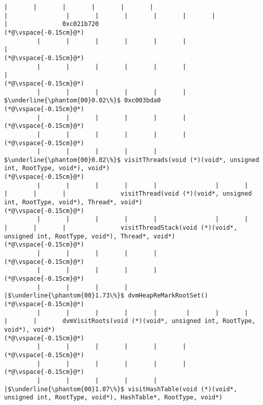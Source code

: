 \begin{lstlisting}[caption=NewDirectByteBuffer, label=profile:C2JNewDirectBuffer-512, numberbychapter=true, frame=lines, float, floatplacement=t]
         |       |       |       |       |       |                                       |                |       |       |       |       |       |                                       |               0xc021b720
(*@\vspace{-0.15cm}@*)
         |       |       |       |       |       |                                       |
(*@\vspace{-0.15cm}@*)
         |       |       |       |       |       |                                       |
(*@\vspace{-0.15cm}@*)
         |       |       |       |       |       |                                        $\underline{\phantom{00}0.02\%}$ 0xc003bda0
(*@\vspace{-0.15cm}@*)
         |       |       |       |       |       |
(*@\vspace{-0.15cm}@*)
         |       |       |       |       |       |
(*@\vspace{-0.15cm}@*)
         |       |       |       |       |        $\underline{\phantom{00}0.02\%}$ visitThreads(void (*)(void*, unsigned int, RootType, void*), void*)
(*@\vspace{-0.15cm}@*)
         |       |       |       |       |                |       |       |       |       |               visitThread(void (*)(void*, unsigned int, RootType, void*), Thread*, void*)
(*@\vspace{-0.15cm}@*)
         |       |       |       |       |                |       |       |       |       |               visitThreadStack(void (*)(void*, unsigned int, RootType, void*), Thread*, void*)
(*@\vspace{-0.15cm}@*)
         |       |       |       |       |
(*@\vspace{-0.15cm}@*)
         |       |       |       |       |
(*@\vspace{-0.15cm}@*)
         |       |       |       |       |$\underline{\phantom{00}1.73\%}$ dvmHeapReMarkRootSet()
(*@\vspace{-0.15cm}@*)
         |       |       |       |       |        |       |       |       |       |       dvmVisitRoots(void (*)(void*, unsigned int, RootType, void*), void*)
(*@\vspace{-0.15cm}@*)
         |       |       |       |       |       |
(*@\vspace{-0.15cm}@*)
         |       |       |       |       |       |
(*@\vspace{-0.15cm}@*)
         |       |       |       |       |       |$\underline{\phantom{00}1.07\%}$ visitHashTable(void (*)(void*, unsigned int, RootType, void*), HashTable*, RootType, void*)

\end{lstlisting}
